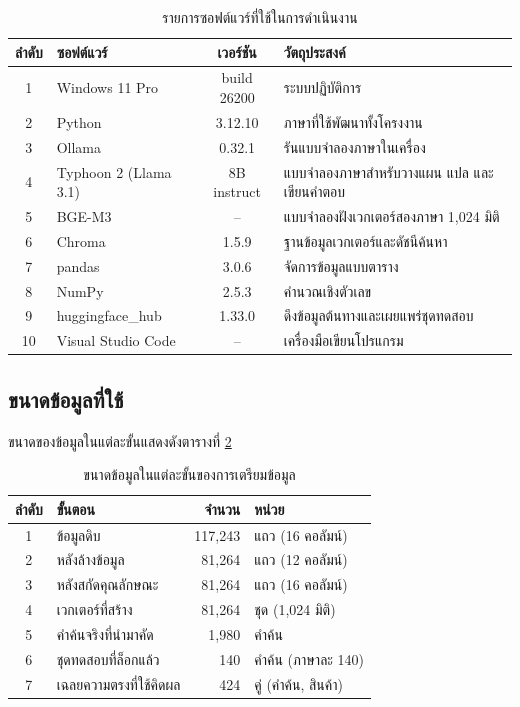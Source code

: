 \begin{table}[H]
\centering
\caption{รายการซอฟต์แวร์ที่ใช้ในการดำเนินงาน}
\label{tab:software}
\small
\begin{tabular}{|c|l|c|p{5.2cm}|}
\hline
\textbf{ลำดับ} & \textbf{ซอฟต์แวร์} & \textbf{เวอร์ชัน} & \textbf{วัตถุประสงค์} \\
\hline
1 & Windows 11 Pro & build 26200 & ระบบปฏิบัติการ \\ \hline
2 & Python & 3.12.10 & ภาษาที่ใช้พัฒนาทั้งโครงงาน \\ \hline
3 & Ollama & 0.32.1 & รันแบบจำลองภาษาในเครื่อง \\ \hline
4 & Typhoon 2 (Llama 3.1) & 8B instruct & แบบจำลองภาษาสำหรับวางแผน แปล และเขียนคำตอบ \\ \hline
5 & BGE-M3 & -- & แบบจำลองฝังเวกเตอร์สองภาษา 1{,}024 มิติ \\ \hline
6 & Chroma & 1.5.9 & ฐานข้อมูลเวกเตอร์และดัชนีค้นหา \\ \hline
7 & pandas & 3.0.6 & จัดการข้อมูลแบบตาราง \\ \hline
8 & NumPy & 2.5.3 & คำนวณเชิงตัวเลข \\ \hline
9 & huggingface\_hub & 1.33.0 & ดึงข้อมูลต้นทางและเผยแพร่ชุดทดสอบ \\ \hline
10 & Visual Studio Code & -- & เครื่องมือเขียนโปรแกรม \\
\hline
\end{tabular}
\end{table}

\subsection{ขนาดข้อมูลที่ใช้}

ขนาดของข้อมูลในแต่ละขั้นแสดงดังตารางที่ \ref{tab:datasize}

\begin{table}[H]
\centering
\caption{ขนาดข้อมูลในแต่ละขั้นของการเตรียมข้อมูล}
\label{tab:datasize}
\begin{tabular}{|c|l|r|l|}
\hline
\textbf{ลำดับ} & \textbf{ขั้นตอน} & \textbf{จำนวน} & \textbf{หน่วย} \\
\hline
1 & ข้อมูลดิบ & 117{,}243 & แถว (16 คอลัมน์) \\ \hline
2 & หลังล้างข้อมูล & 81{,}264 & แถว (12 คอลัมน์) \\ \hline
3 & หลังสกัดคุณลักษณะ & 81{,}264 & แถว (16 คอลัมน์) \\ \hline
4 & เวกเตอร์ที่สร้าง & 81{,}264 & ชุด (1{,}024 มิติ) \\ \hline
5 & คำค้นจริงที่นำมาคัด & 1{,}980 & คำค้น \\ \hline
6 & ชุดทดสอบที่ล็อกแล้ว & 140 & คำค้น (ภาษาละ 140) \\ \hline
7 & เฉลยความตรงที่ใช้คิดผล & 424 & คู่ (คำค้น, สินค้า) \\
\hline
\end{tabular}
\end{table}

